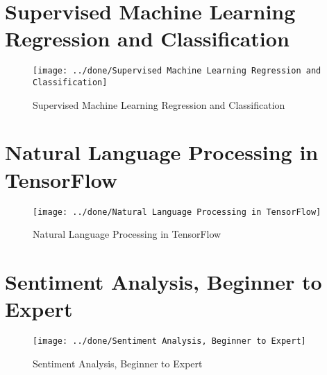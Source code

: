 \documentclass[a4paper,12pt]{article}
\begin{document}
\section*{Supervised Machine Learning Regression and Classification}
\begin{figure}[h]
	\centering
	\vspace{-10pt} %
	\texttt{[image: ../done/Supervised Machine Learning Regression and Classification]}
	\vspace{-10pt} %
	\caption{Supervised Machine Learning Regression and Classification}
	\vspace{-10pt} %
\end{figure}
\newpage 
\section*{Natural Language Processing in TensorFlow}
\begin{figure}[h]
	\centering
	\vspace{-10pt} %
	\texttt{[image: ../done/Natural Language Processing in TensorFlow]}
	\vspace{-10pt} %
	\caption{Natural Language Processing in TensorFlow}
	\vspace{-10pt} %
\end{figure}


\section*{Sentiment Analysis, Beginner to Expert}
\begin{figure}[h]
	\centering
	\vspace{-10pt} %
	\texttt{[image: ../done/Sentiment Analysis, Beginner to Expert]}
	\vspace{-10pt} %
	\caption{Sentiment Analysis, Beginner to Expert}
	\vspace{-10pt} %
\end{figure}
\newpage 
\end{document}
